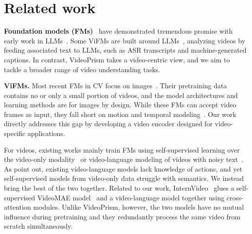 \documentclass{article}
\theoremstyle{plain}
\theoremstyle{definition}
\theoremstyle{remark}
\newcommand{\OURS}{VideoPrism\xspace}
\begin{document}
 \section{Related work}

\textbf{Foundation models (FMs)}~\cite{bommasani2021opportunities} have demonstrated tremendous promise with early work in LLMs~\cite{devlin2019bert,brown2020language}. Some ViFMs are built around LLMs~\cite{wang2022language,li2023blip,zhang2023video,chen2023videollm}, analyzing videos by feeding associated text to LLMs, such as ASR transcripts and machine-generated captions. In contrast, \OURS takes a video-centric view, and we aim to tackle a broader range of video understanding tasks.

\textbf{ViFMs.} Most recent FMs in CV focus on images~\cite{radford2021learning,yuan2021florence,jia2021scaling,yu2022coca,alayrac2022flamingo,yan2022videococa,wang2022omnivl,chen2023pali,xu2023mplug,girdhar2023imagebind,zhang2023cae,zhu2023languagebind}. Their pretraining data contains no or only a small portion of videos, and the model architectures and learning methods are for images by design. While these FMs can accept video frames as input, they fall short on motion and temporal modeling~\cite{yuan2023videoglue}. 
Our work directly addresses this gap by developing a video encoder designed for video-specific applications.

For videos, existing works mainly train FMs using self-supervised learning over the video-only modality~\cite{qian2021spatiotemporal,feichtenhofer2021large,recasens2021broaden,singh2021semi,wei2022masked,yuan2022contextualized,qian2022temporal,tong2022videomae,wang2023videomae} or video-language modeling of videos with noisy text~\cite{zellers2021merlot,fu2021violet,li2023lavender,wang2023all,cheng2023vindlu,piergiovanni2023mirasol3b,xiong2023spatiotemporally}. As \citet{wang2023paxion} point out, existing video-language models lack knowledge of actions, and yet self-supervised models from video-only data struggle with semantics. We instead bring the best of the two together. Related to our work, InternVideo~\cite{wang2022internvideo} glues a self-supervised VideoMAE model~\cite{wang2023videomae} and a video-language model together using cross-attention modules. Unlike \OURS, however, the two models have no mutual influence during pretraining and they redundantly process the same video from scratch simultaneously. 
\end{document}
